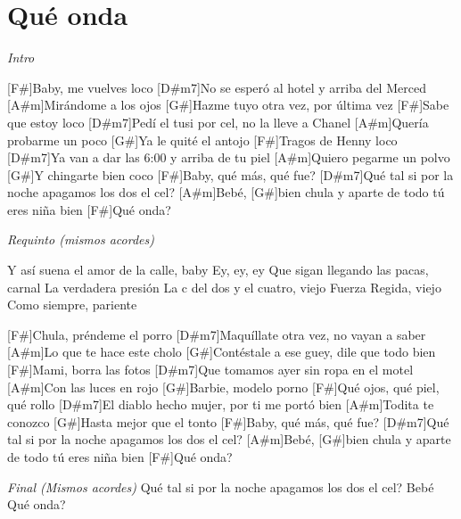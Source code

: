 \section{Qu\'e onda}

\noindent
\vspace{1cm}

\begin{guitar}
	\begin{multicols}{2}

	\textit{Intro}

	[F#]Baby, me vuelves loco
	[D#m7]No se esper\'o al hotel y arriba del Merced
	[A#m]Mir\'andome a los ojos
	[G#]Hazme tuyo otra vez, por \'ultima vez
	[F#]Sabe que estoy loco
	[D#m7]Ped\'i el tusi por cel, no la lleve a Chanel
	[A#m]Quer\'ia probarme un poco
	[G#]Ya le quit\'e el antojo
	[F#]Tragos de Henny loco
	[D#m7]Ya van a dar las 6:00 y arriba de tu piel
	[A#m]Quiero pegarme un polvo
	[G#]Y chingarte bien coco
	[F#]Baby, qu\'e m\'as, qué fue?
	[D#m7]Qu\'e tal si por la noche apagamos los dos el cel?
	[A#m]Beb\'e, [G#]bien chula y aparte de todo t\'u eres ni\~{n}a bien
	[F#]Qu\'e onda?


	\textit{Requinto (mismos acordes)}

		Y as\'i suena el amor de la calle, baby
		Ey, ey, ey
		Que sigan llegando las pacas, carnal
		La verdadera presi\'on
		La c del dos y el cuatro, viejo
		Fuerza Regida, viejo
		Como siempre, pariente


		[F#]Chula, pr\'endeme el porro
		[D#m7]Maqu\'illate otra vez, no vayan a saber
		[A#m]Lo que te hace este cholo
		[G#]Cont\'estale a ese guey, dile que todo bien
		[F#]Mami, borra las fotos
		[D#m7]Que tomamos ayer sin ropa en el motel
		[A#m]Con las luces en rojo
		[G#]Barbie, modelo porno
		[F#]Qu\'e ojos, qu\'e piel, qu\'e rollo
		[D#m7]El diablo hecho mujer, por ti me port\'o bien
		[A#m]Todita te conozco
		[G#]Hasta mejor que el tonto
		[F#]Baby, qu\'e m\'as, qué fue?
		[D#m7]Qu\'e tal si por la noche apagamos los dos el cel?
		[A#m]Beb\'e, [G#]bien chula y aparte de todo t\'u eres niña bien
		[F#]Qu\'e onda?


	\textit{Final (Mismos acordes)}
		Qu\'e tal si por la noche apagamos los dos el cel?
		Beb\'e
		Qu\'e onda?
	\end{multicols}
\end{guitar}
